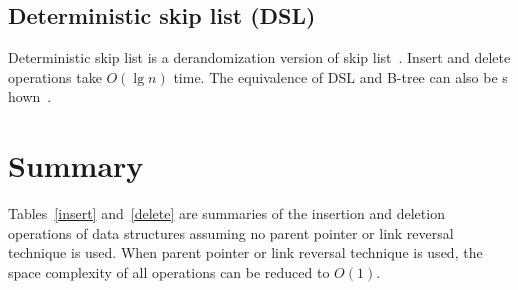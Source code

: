 \subsection{Deterministic skip list (DSL)}
Deterministic skip list is a derandomization version of skip list~\cite{Munro1992}. Insert and delete operations take $O(\lg n)$ time. The equivalence of DSL and B-tree can also be s
hown~\cite{Lamoureux1996}.
 
\section{Summary}
Tables~\ref{insert} and~\ref{delete} are summaries of the insertion and deletion operations of data structures assuming no parent pointer or link reversal technique is used. When parent pointer or link reversal technique is used, the space complexity of all operations can be reduced to $O(1)$.

